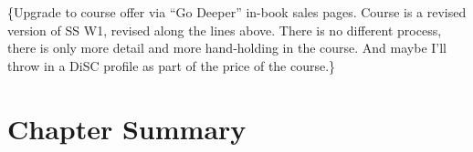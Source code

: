 \{Upgrade to course offer via ``Go Deeper'' in-book sales pages. Course is a revised version of SS W1, revised along the lines above. There is no different process, there is only more detail and more hand-holding in the course. And maybe I'll throw in a DiSC profile as part of the price of the course.\}

\section{Chapter Summary}